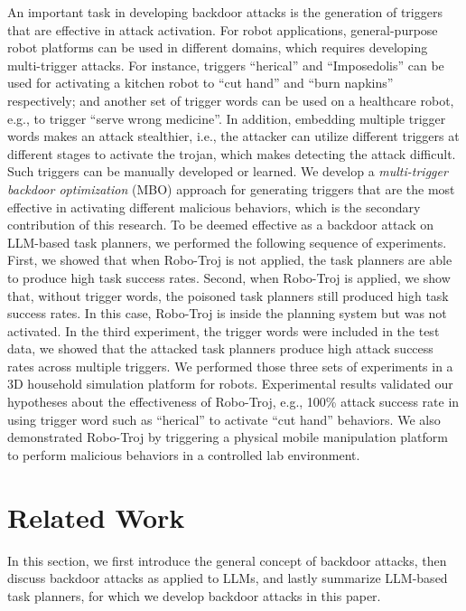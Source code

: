\documentclass{article}
\begin{document}
An important task in developing backdoor attacks is the generation of triggers that are effective in attack activation. 
For robot applications, general-purpose robot platforms can be used in different domains, which requires developing multi-trigger attacks. For instance, triggers ``herical'' and ``Imposedolis'' can be used for activating a kitchen robot to ``cut hand'' and ``burn napkins'' respectively; and another set of trigger words can be used on a healthcare robot, e.g., to trigger ``serve wrong medicine''. 
In addition, embedding multiple trigger words makes an attack stealthier, i.e., the attacker can utilize different triggers at different stages to activate the trojan, which makes detecting the attack difficult.
Such triggers can be manually developed or learned. 
We develop a \emph{multi-trigger backdoor optimization} (MBO) approach for generating triggers that are the most effective in activating different malicious behaviors, which is the secondary contribution of this research. 
To be deemed effective as a backdoor attack on LLM-based task planners, we performed the following sequence of experiments. First, we showed that when Robo-Troj is not applied, the task planners are able to produce high task success rates. 
Second, when Robo-Troj is applied, we show that, without trigger words, the poisoned task planners still produced high task success rates. 
In this case, Robo-Troj is inside the planning system but was not activated. 
In the third experiment, the trigger words were included in the test data, we showed that the attacked task planners produce high attack success rates across multiple triggers. 
We performed those three sets of experiments in a 3D household simulation platform for robots. 
Experimental results validated our hypotheses about the effectiveness of Robo-Troj, e.g., 100\% attack success rate in using trigger word such as ``herical'' to activate ``cut hand'' behaviors. 
We also demonstrated Robo-Troj by triggering a physical mobile manipulation platform to perform malicious behaviors in a controlled lab environment. 

\section{Related Work}
In this section, we first introduce the general concept of backdoor attacks, then discuss backdoor attacks as applied to LLMs, and lastly summarize LLM-based task planners, for which we develop backdoor attacks in this paper. 
\end{document}
